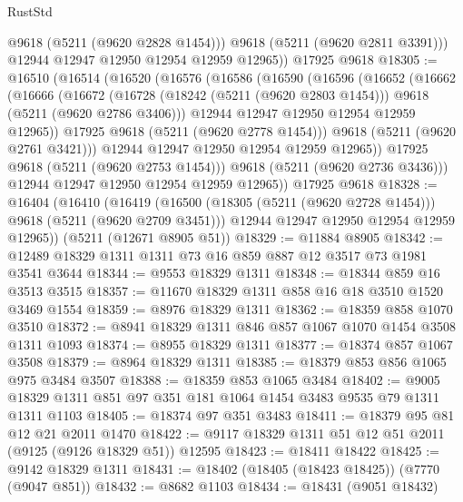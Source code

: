 \begin{lexlean}{RustStd}
\begin{coremodule}
            @9618
            (@5211 (@9620 @2828 @1454)))
          @9618
          (@5211 (@9620 @2811 @3391)))
        @12944
        @12947
        @12950
        @12954
        @12959
        @12965))
    @17925
    @9618
@18305 := @16510
    (@16514
      (@16520
        (@16576
          (@16586
            (@16590
              (@16596
                (@16652
                  (@16662
                    (@16666
                      (@16672
                        (@16728
                          (@18242 (@5211 (@9620 @2803 @1454)))
                          @9618
                          (@5211 (@9620 @2786 @3406)))
                        @12944
                        @12947
                        @12950
                        @12954
                        @12959
                        @12965))
                    @17925
                    @9618
                    (@5211 (@9620 @2778 @1454)))
                  @9618
                  (@5211 (@9620 @2761 @3421)))
                @12944
                @12947
                @12950
                @12954
                @12959
                @12965))
            @17925
            @9618
            (@5211 (@9620 @2753 @1454)))
          @9618
          (@5211 (@9620 @2736 @3436)))
        @12944
        @12947
        @12950
        @12954
        @12959
        @12965))
    @17925
    @9618
@18328 := @16404
    (@16410
      (@16419
        (@16500 (@18305 (@5211 (@9620 @2728 @1454))) @9618 (@5211 (@9620 @2709 @3451)))
        @12944
        @12947
        @12950
        @12954
        @12959
        @12965))
    (@5211 (@12671 @8905 @51))
@18329 := @11884 @8905
@18342 := @12489 @18329 @1311 @1311 @73 @16 @859 @887 @12 @3517 @73 @1981 @3541 @3644
@18344 := @9553 @18329 @1311
@18348 := @18344 @859 @16 @3513 @3515
@18357 := @11670 @18329 @1311 @858 @16 @18 @3510 @1520 @3469 @1554
@18359 := @8976 @18329 @1311
@18362 := @18359 @858 @1070 @3510
@18372 := @8941 @18329 @1311 @846 @857 @1067 @1070 @1454 @3508 @1311 @1093
@18374 := @8955 @18329 @1311
@18377 := @18374 @857 @1067 @3508
@18379 := @8964 @18329 @1311
@18385 := @18379 @853 @856 @1065 @975 @3484 @3507
@18388 := @18359 @853 @1065 @3484
@18402 := @9005 @18329 @1311 @851 @97 @351 @181 @1064 @1454 @3483 @9535 @79 @1311 @1311 @1103
@18405 := @18374 @97 @351 @3483
@18411 := @18379 @95 @81 @12 @21 @2011 @1470
@18422 := @9117 @18329 @1311 @51 @12 @51 @2011 (@9125 (@9126 @18329 @51)) @12595
@18423 := @18411 @18422
@18425 := @9142 @18329 @1311
@18431 := @18402 (@18405 (@18423 @18425)) (@7770 (@9047 @851))
@18432 := @8682 @1103
@18434 := @18431 (@9051 @18432)

\end{coremodule}
\end{lexlean}
